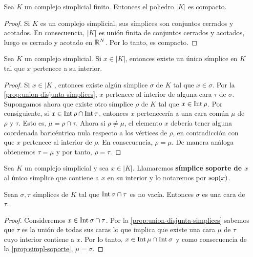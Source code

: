 \begin{proposicion}
	Sea $K$ un complejo simplicial finito. Entonces el poliedro $|K|$ es compacto.
\end{proposicion}
\begin{proof}
	Si $K$ es un complejo simplicial, sus símplices son conjuntos cerrados y
	acotados. En consecuencia, $|K|$ es unión finita de conjuntos cerrados y
	acotados, luego es cerrado y acotado en $\mathbb{R}^{N}$. Por lo tanto, es compacto.
\end{proof}
\begin{proposicion}
	Sea $K$ un complejo simplicial. \label{prop:simpl-soporte} Si $x \in |K|$, entonces
	existe un único símplice en $K$ tal que $x$ pertenece a su interior.
\end{proposicion}
\begin{proof}
	Si $x \in |K|$, entonces existe algún símplice $\sigma$ de $K$ tal que
	$x \in \sigma$. Por la \autoref{prop:union-disjunta-simplices}, $x$ pertenece
	al interior de alguna cara $\tau$ de $\sigma$. Supongamos ahora que existe otro
	símplice $\rho$ de $K$ tal que $x \in \operatorname{Int} \rho$. Por consiguiente, si $x
	\in \operatorname{Int} \rho \cap \operatorname{Int} \tau$, entonces $x$ pertenecería a una cara
	común $\mu$ de $\rho$ y $\tau$. Esto es, $\mu = \rho \cap \tau$. Ahora si $\rho
	\neq \mu$, el elemento $x$ debería tener alguna coordenada baricéntrica nula
	respecto a los vértices de $\rho$, en contradicción con que $x$ pertenece al interior
	de $\rho$. En consecuencia, $\rho = \mu$. De manera análoga obtenemos
	$\tau = \mu$ y por tanto, $\rho = \tau$.
\end{proof}
\begin{definicion}
	Sea $K$ un complejo simplicial y sea $x \in |K|$. Llamaremos \textbf{símplice
		soporte de $x$} al único símplice que contiene a $x$ en su interior y lo notaremos
	por $\operatorname{sop}(x)$.
\end{definicion}
\begin{corolario}
	\label{cor:simpl-soporte} Sean $\sigma, \tau$ símplices de $K$ tal que $\operatorname{Int}
	\sigma \cap \tau$ es no vacía. Entonces $\sigma$ es una cara de $\tau$.
\end{corolario}
\begin{proof}
	Consideremos $x \in \operatorname{Int} \sigma \cap \tau$. Por la
	\autoref{prop:union-disjunta-simplices} sabemos que $\tau$ es la unión de
	todas sus caras lo que implica que existe una cara $\mu$ de $\tau$ cuyo
	interior contiene a $x$. Por lo tanto,
	$x \in \operatorname{Int} \mu \cap \operatorname{Int} \sigma$ y como consecuencia de la
	\autoref{prop:simpl-soporte}, $\mu = \sigma$.
\end{proof}
